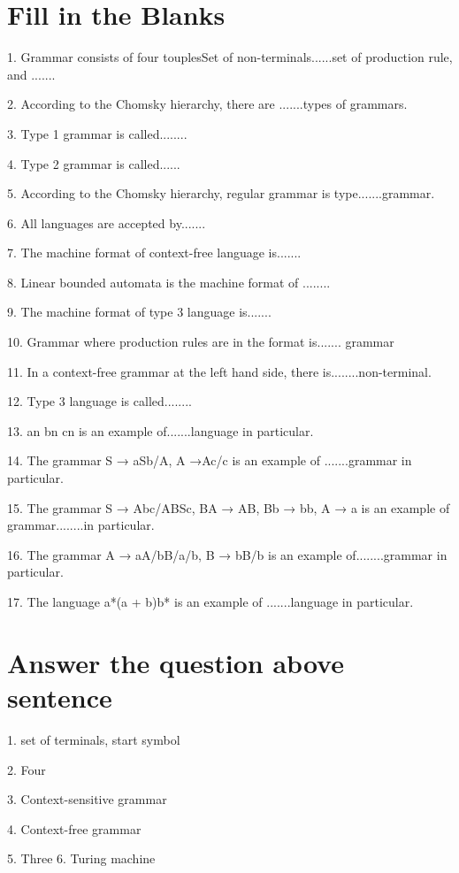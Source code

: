 \documentclass[]{article}
\begin{document}
\section{Fill in the Blanks}
 1. Grammar consists of four touplesSet of non-terminals......set of production rule, and
.......
 
 
 2. According to the Chomsky hierarchy, there are .......types of grammars.
 
 
 3. Type 1 grammar is called........
 
 
 4. Type 2 grammar is called......
 
 
 5. According to the Chomsky hierarchy, regular grammar is type.......grammar.
 
 
 6. All languages are accepted by.......
 
 
 7. The machine format of context-free language is.......
 
 
 8. Linear bounded automata is the machine format of ........
 
 
 9. The machine format of type 3 language is.......
 
 
 10. Grammar where production rules are in the format  is....... grammar
 
 
 11. In a context-free grammar at the left hand side, there is........non-terminal.
 
 
 12. Type 3 language is called........
 
 
 13. an bn cn is an example of.......language in particular.
 
 
 14. The grammar S → aSb/A, A →Ac/c is an example of .......grammar in particular.
 
 
 15. The grammar S → Abc/ABSc, BA → AB, Bb → bb, A → a is an example of grammar........in particular.
 
 
 16. The grammar A → aA/bB/a/b, B → bB/b is an example of........grammar in particular.


 17. The language a*(a + b)b* is an example of .......language in particular.
 
 
 \section{Answer the question above sentence}
  1. set of terminals, start symbol 
  
  
  2. Four 
  
  
  3. Context-sensitive grammar
  
  
 4. Context-free grammar 
 
 
 5. Three 6. Turing machine
 
\end{document}
